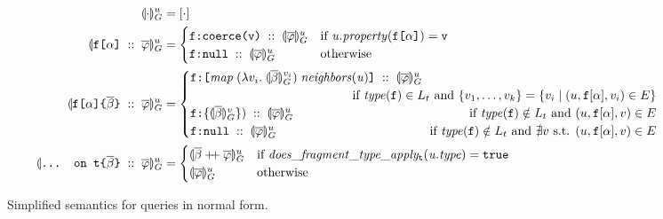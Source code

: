\setcounter{equation}{0}%
\begin{figure*}[h]
    \centering
    \begin{align}
    \seval{\cdot}{u} &= [\cdot] \\
    \sevalu{\fld\; ::\; \queries} &= 
    \begin{cases}
      \resp{\texttt{coerce(\val)}} \; ::\; \sevalu{\queries}  
      & \text{if }\mathit{u.property}(\fld) = \val \\
      \resp{\nval} \; :: \; \sevalu{\queries} 
      & \text{otherwise}
    \end{cases}\\
    \sevalu{\nfld{\overline{\beta}} \; ::\; \queries} &=
    \begin{cases}
      \resp{\texttt{[} \mathit{map}\; (\lambda v_{i}.\; \seval{\overline{\beta}}{v_{i}})\; 
      \mathit{neighbors(u)} \texttt{]}} \; :: \; \sevalu{\queries}  \\
      \hfill \text{ if } 
        \mathit{type(\fkey)} \in L_{t} 
          \text{ and } \{v_{1}, \ldots, v_{k}\} = \{v_{i} \mid (u, \fkey[\alpha], 
        v_{i}) \in E\} \\
      \resp{\{\seval{\subqueries{\beta}}{v}\})} \; :: \; \sevalu{\queries}  
      \hfill \text{ if } 
        \mathit{type(\fkey)} \notin L_{t} 
        \text{ and } (u, \fkey[\alpha], v) \in E \\
      \resp{\nval} \; :: \; \sevalu{\queries} 
      \qquad \qquad \qquad \qquad \qquad \qquad
      \text{ if } \mathit{type(\fkey)} \notin L_{t} 
        \text{ and } \nexists v \text{ s.t. } (u, \fkey[\alpha], v) \in E \\
    \end{cases}\\
    \sevalu{\ifrag{t}{\overline{\beta}}\; ::\; \queries} &= \begin{cases}
    \sevalu{\overline{\beta} \mdoubleplus \queries} & 
    \text{if }\mathit{does\_fragment\_type\_apply_{\texttt{t}}(u.type)} = \texttt{true}\\
    \sevalu{\queries} & \text{otherwise}
    \end{cases}
    \end{align}
    \caption{Simplified semantics for queries in normal form. }
    \label{fig:simpl_semantics}
\end{figure*}


